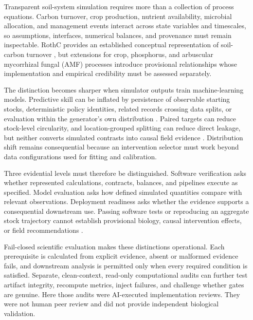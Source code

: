 \documentclass[11pt]{article}
\begin{document}
Transparent soil-system simulation requires more than a collection of process equations. Carbon turnover, crop production, nutrient availability, microbial allocation, and management events interact across state variables and timescales, so assumptions, interfaces, numerical balances, and provenance must remain inspectable. RothC provides an established conceptual representation of soil-carbon turnover \citep{coleman1996rothc,rothamsted2024rothc,coleman2024pythonrothc}, but extensions for crop, phosphorus, and arbuscular mycorrhizal fungal (AMF) processes introduce provisional relationships whose implementation and empirical credibility must be assessed separately.

The distinction becomes sharper when simulator outputs train machine-learning models. Predictive skill can be inflated by persistence of observable starting stocks, deterministic policy identities, related records crossing data splits, or evaluation within the generator's own distribution \citep{kapoor2023leakage,geirhos2020shortcut,roberts2021common}. Paired targets can reduce stock-level circularity, and location-grouped splitting can reduce direct leakage, but neither converts simulated contrasts into causal field evidence \citep{prosperi2020causal}. Distribution shift remains consequential because an intervention selector must work beyond data configurations used for fitting and calibration.

Three evidential levels must therefore be distinguished. Software verification asks whether represented calculations, contracts, balances, and pipelines execute as specified. Model evaluation asks how defined simulated quantities compare with relevant observations. Deployment readiness asks whether the evidence supports a consequential downstream use. Passing software tests or reproducing an aggregate stock trajectory cannot establish provisional biology, causal intervention effects, or field recommendations \citep{oreskes1994verification,refsgaard2004modelling,peng2011reproducible}.

Fail-closed scientific evaluation makes these distinctions operational. Each prerequisite is calculated from explicit evidence, absent or malformed evidence fails, and downstream analysis is permitted only when every required condition is satisfied. Separate, clean-context, read-only computational audits can further test artifact integrity, recompute metrics, inject failures, and challenge whether gates are genuine. Here those audits were AI-executed implementation reviews. They were not human peer review and did not provide independent biological validation.
\end{document}
